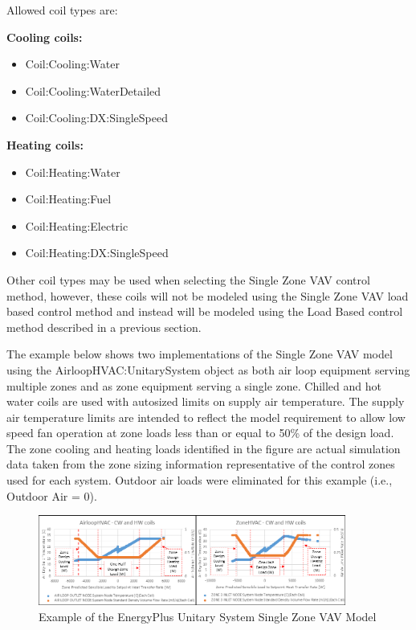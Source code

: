 Allowed coil types are:

\textbf{Cooling coils:}
\begin{itemize}
\item Coil:Cooling:Water
\item Coil:Cooling:WaterDetailed
\item Coil:Cooling:DX:SingleSpeed
\end{itemize}

\textbf{Heating coils:}
\begin{itemize}
\item Coil:Heating:Water
\item Coil:Heating:Fuel
\item Coil:Heating:Electric
\item Coil:Heating:DX:SingleSpeed
\end{itemize}

Other coil types may be used when selecting the Single Zone VAV control method, however, these coils will not be modeled using the Single Zone VAV load based control method and instead will be modeled using the Load Based control method described in a previous section.

The example below shows two implementations of the Single Zone VAV model using the AirloopHVAC:UnitarySystem object as both air loop equipment serving multiple zones and as zone equipment serving a single zone. Chilled and hot water coils are used with autosized limits on supply air temperature. The supply air temperature limits are intended to reflect the model requirement to allow low speed fan operation at zone loads less than or equal to 50\% of the design load. The zone cooling and heating loads identified in the figure are actual simulation data taken from the zone sizing information representative of the control zones used for each system. Outdoor air loads were eliminated for this example (i.e., Outdoor Air = 0).

\begin{figure}[hbtp]
\centering
\includegraphics[width=0.9\textwidth, height=0.9\textheight, keepaspectratio=true]{media/UnitarySystem_SZVAV_watercoils.png}
\caption{Example of the EnergyPlus Unitary System Single Zone VAV Model \protect \label{fig:example-of-the-energyplus-unitary-system-single-zone-vav-model}}
\end{figure}

